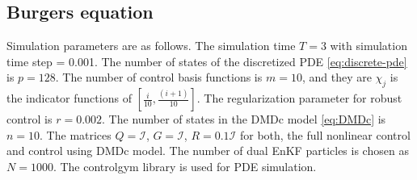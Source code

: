 \documentclass[10pt,a4paper]{amsart}
\newcommand{\todo}[1]{{\color{blue} #1}}
\newcommand{\id}{\mathcal{I}}
\begin{document}
\subsection{Burgers equation}
\label{app:burgers}
Simulation parameters are as follows. The simulation time $T = 3$ %
with simulation time step = 0.001. 
The number of states of the discretized PDE \eqref{eq:discrete-pde} is $p=128$. 
The number of control basis functions is $m=10$, and they are $\chi_j$ is the indicator functions of $[\frac{i}{10},\frac{(i+1)}{10}]$. The regularization parameter for robust control is $r = 0.002$.
The number of states in the DMDc model \eqref{eq:DMDc} is $n=10$. The matrices  $Q = \id$, $G=\id$, $R=0.1\id$ for both, the full nonlinear control and control using DMDc model.
The number of dual EnKF particles is chosen as $N=1000$. 
The controlgym library \cite{zhang2023controlgym} is used for PDE simulation. 
\end{document}
